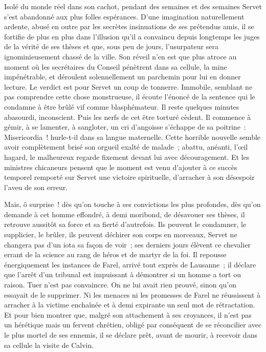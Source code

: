 \documentclass[french,twoside]{book} %
\newcommand{\astermono}{\medskip\centerline{\color{rubric}\large\selectfont{\syms ✻}}\medskip\par}%
\begin{document}
\astermono

\noindent Isolé du monde réel dans son cachot, pendant des semaines et des semaines Servet s’est abandonné aux plus folles espérances. D’une imagination naturellement ardente, abusé en outre par les secrètes insinuations de ses prétendus amis, il se fortifie de plus en plus dans l’illusion qu’il a convaincu depuis longtemps les juges de la vérité de ses thèses et que, sous peu de jours, l’usurpateur sera ignominieusement chassé de la ville. Son réveil n’en est que plus atroce au moment où les secrétaires du Conseil pénètrent dans sa cellule, la mine impénétrable, et déroulent solennellement un parchemin pour lui en donner lecture. Le verdict est pour Servet un coup de tonnerre. Immobile, semblant ne pas comprendre cette chose monstrueuse, il écoute l’énoncé de la sentence qui le condamne à être brûlé vif comme blasphémateur. Il reste quelques minutes abasourdi, inconscient. Puis les nerfs de cet être torturé cèdent. Il commence à gémir, à se lamenter, à sangloter, un cri d’angoisse s’échappe de sa poitrine : Misericordia ! hurle-t-il dans sa langue maternelle. Cette horrible nouvelle semble avoir complètement brisé son orgueil exalté de malade ; abattu, anéanti, l’œil hagard, le malheureux regarde fixement devant lui avec découragement. Et les ministres chicaneurs pensent que le moment est venu d’ajouter à ce succès temporel remporté sur Servet une victoire spirituelle, d’arracher à son désespoir l’aveu de son erreur.\par
Mais, ô surprise ! dès qu’on touche à ses convictions les plus profondes, dès qu’on demande à cet homme effondré, à demi moribond, de désavouer ses thèses, il retrouve aussitôt sa force et sa fierté d’autrefois. Ils peuvent le condamner, le supplicier, le brûler, ils peuvent déchirer son corps en morceaux, Servet ne changera pas d’un iota sa façon de voir ; ses derniers jours élèvent ce chevalier errant de la science au rang de héros et de martyr de la foi. Il repousse énergiquement les instances de Farel, arrivé tout exprès de Lausanne ; il déclare que l’arrêt d’un tribunal est impuissant à démontrer si un homme a tort ou raison. Tuer n’est pas convaincre. On ne lui avait rien prouvé, sinon qu’on essayait de le supprimer. Ni les menaces ni les promesses de Farel ne réussissent à arracher à la victime enchaînée et à demi expirante un seul mot de rétractation. Et pour bien montrer que, malgré son attachement à ses croyances, il n’est pas un hérétique mais un fervent chrétien, obligé par conséquent de se réconcilier avec le plus mortel de ses ennemis, il se déclare prêt, avant de mourir, à recevoir dans sa cellule la visite de Calvin.\par
\end{document}
